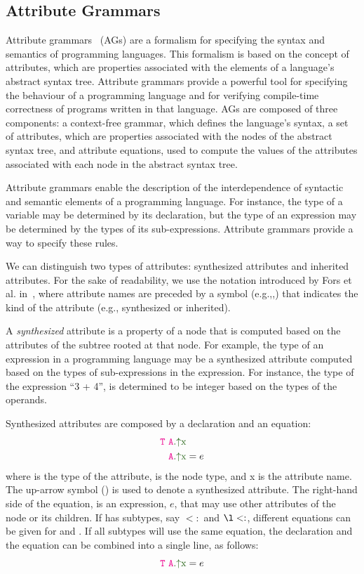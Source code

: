 \subsection{Attribute Grammars}%
\label{chap:attr-grammars}
Attribute grammars~\cite{knuth1968semantics} (AGs) are a formalism for specifying
the syntax and semantics of programming languages. This formalism is based on the concept of attributes,
which are properties associated with the elements of a language's abstract syntax tree.
Attribute grammars provide a powerful tool for specifying the behaviour of a programming
language and for verifying compile-time correctness of programs written in that language.
%
AGs are composed of three components: a context-free grammar,
which defines the language's syntax,  a set of attributes,
which are properties associated with the nodes of the abstract syntax tree,
and attribute equations, used to compute the values of the attributes associated 
with each node in the abstract syntax tree.

Attribute grammars enable the description of the
interdependence of syntactic and semantic elements of a programming language.
For instance, the type of a variable may be determined by its declaration,
but the type of an expression may be determined by the types of its sub-expressions.
Attribute grammars provide a way to specify these rules.

We can distinguish two types of attributes: synthesized attributes and inherited attributes.
For the sake of readability, we use the notation introduced by Fors et al. in~\cite{fors2020patterns},
where attribute names are preceded by a symbol (e.g.,\textcolor{ATGsym}{\mSyn{}},\textcolor{ATGsym}{\mInh{}})
that indicates the kind of the attribute (e.g., synthesized or inherited).

A \emph{synthesized} attribute is a property of a node that is computed
based on the attributes of the subtree rooted at that node. For example, the type of an expression
in a programming language may be a synthesized attribute computed based
on the types of sub-expressions in the expression. For instance, the type of the expression ``3 + 4'',
is determined to be integer based on the types of the operands.

Synthesized attributes are composed by a declaration and an equation:
\begin{align*}
  \astnode{T}\ &\Asyn{A}{x} \\
   &\Asyn{A}{x} = e
\end{align*}
where  is the type of the attribute,  is the node type, and \textcolor{ATGsym}{x} is the attribute name.
The up-arrow symbol (\textcolor{ATGsym}{\mSyn{}}) is used to denote a synthesized attribute.
The right-hand side of the equation, is an expression, $e$, that may use other attributes of the  node or its children.
If  has subtypes, say $<:$ and $\l<:$, different equations can be given for
 and . If all subtypes will use the same equation, the declaration and the equation can be combined into a single line, as follows:
\begin{equation*}
 \astnode{T} \  \Asyn{A}{x} = e
\end{equation*}

